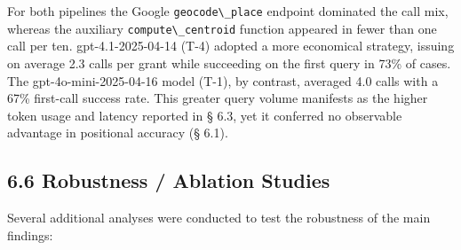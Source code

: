 \documentclass[
  10pt,
  twocolumn]{article}
\begin{document}
For both pipelines the Google \passthrough{\lstinline!geocode\_place!}
endpoint dominated the call mix, whereas the auxiliary
\passthrough{\lstinline!compute\_centroid!} function appeared in fewer
than one call per ten. gpt-4.1-2025-04-14 (T-4) adopted a more
economical strategy, issuing on average 2.3 calls per grant while
succeeding on the first query in 73\% of cases. The
gpt-4o-mini-2025-04-16 model (T-1), by contrast, averaged 4.0 calls with
a 67\% first-call success rate. This greater query volume manifests as
the higher token usage and latency reported in § 6.3, yet it conferred
no observable advantage in positional accuracy (§ 6.1).

\subsection{6.6 Robustness / Ablation
Studies}\label{robustness-ablation-studies}

Several additional analyses were conducted to test the robustness of the
main findings:
\end{document}
